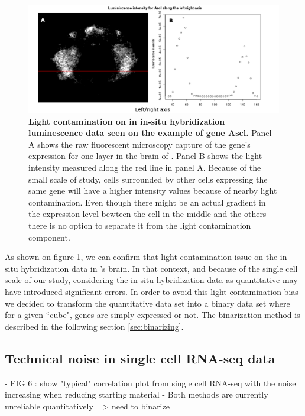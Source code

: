    \begin{figure}[bth]
\centerline{\includegraphics[width=\linewidth]{gfx/chapter2/whybina.png}}
\caption{{\bf Light contamination on in in-situ hybridization luminescence data seen on the example of gene Ascl.} Panel A shows the raw fluorescent microscopy capture of the gene's expression for one layer in the brain of \platy{}. Panel B shows the light intensity measured along the red line in panel A. Because of the small scale of study, cells surrounded by other cells expressing the same gene will have a higher intensity values because of nearby light contamination. Even though there might be an actual gradient in the expression level bewteen the cell in the middle and the others there is no option to separate it from the light contamination component.}\label{fig:why_binarize}
	\end{figure}
  
  As shown on figure \ref{fig:why_binarize}, we can confirm that light contamination issue on the in-situ hybridization data in \platy{}'s brain. In that context, and because of the single cell scale of our study, considering the in-situ hybridization data as quantitative may have introduced significant errors. In order to avoid this light contamination bias we decided to transform the quantitative data set into a binary data set where for a given ``cube", genes are simply expressed or not. The binarization method is described in the following section \ref{sec:binarizing}.
  


  \subsection*{Technical noise in single cell RNA-seq data}
    - FIG 6 : show "typical" correlation plot from single cell RNA-seq with the noise increasing when reducing starting material
    - Both methods are currently unreliable quantitatively => need to binarize

